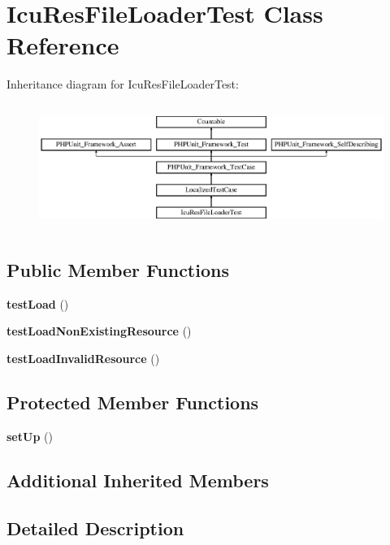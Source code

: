 \section{Icu\+Res\+File\+Loader\+Test Class Reference}
\label{class_symfony_1_1_component_1_1_translation_1_1_tests_1_1_loader_1_1_icu_res_file_loader_test}
Inheritance diagram for Icu\+Res\+File\+Loader\+Test\+:\begin{figure}[H]
\begin{center}
\leavevmode
\includegraphics[height=4.129793cm]{class_symfony_1_1_component_1_1_translation_1_1_tests_1_1_loader_1_1_icu_res_file_loader_test}
\end{center}
\end{figure}
\subsection*{Public Member Functions}
\begin{DoxyCompactItemize}
\item 
{\bf test\+Load} ()
\item 
{\bf test\+Load\+Non\+Existing\+Resource} ()
\item 
{\bf test\+Load\+Invalid\+Resource} ()
\end{DoxyCompactItemize}
\subsection*{Protected Member Functions}
\begin{DoxyCompactItemize}
\item 
{\bf set\+Up} ()
\end{DoxyCompactItemize}
\subsection*{Additional Inherited Members}


\subsection{Detailed Description}


